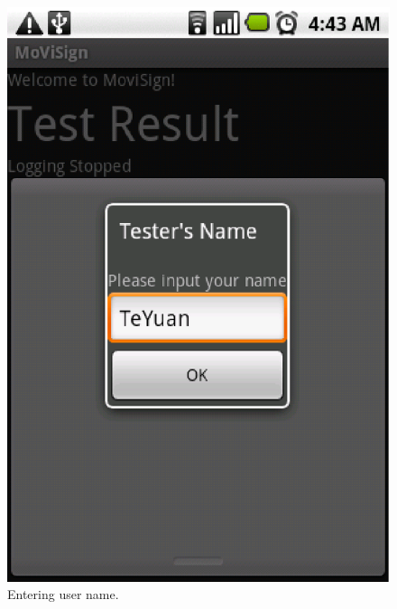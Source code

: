 \documentclass[12pt]{article}
\begin{document}
\begin{figure}[ht]
\label{fig:gui}
\begin{minipage}[b]{0.3\textwidth}
\centering
\includegraphics[width=\textwidth]{name}
\caption{Entering user name.}
\label{fig:name}
\end{minipage}
\begin{minipage}[b]{0.3\textwidth}
\centering

\end{minipage}
\end{figure}
\end{document}
